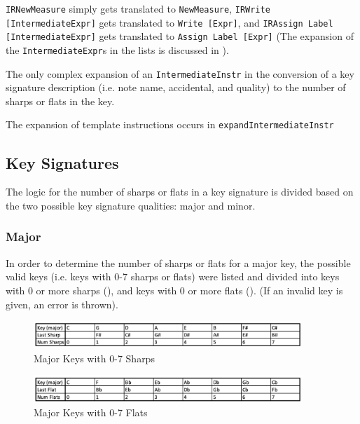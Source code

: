 \documentclass{report}
\begin{document}
\verb.IRNewMeasure. simply gets translated to \verb.NewMeasure., \verb.IRWrite [IntermediateExpr]. gets translated to \verb.Write [Expr]., and \verb.IRAssign Label [IntermediateExpr]. gets translated to \verb.Assign Label [Expr]. (The expansion of the \verb.IntermediateExpr.s in the lists is discussed in ). 

The only complex expansion of an \verb.IntermediateInstr. in the conversion of a key signature description (i.e. note name, accidental, and quality) to the number of sharps or flats in the key.

The expansion of template instructions occurs in \verb.expandIntermediateInstr.
\subsection{Key Signatures}
The logic for the number of sharps or flats in a key signature is divided based on the two possible key signature qualities: major and minor. 
\subsubsection{Major}

In order to determine the number of sharps or flats for a major key, the possible valid keys (i.e. keys with 0-7 sharps or flats) were listed and divided into keys with 0 or more sharps (), and keys with 0 or more flats (). (If an invalid key is given, an error is thrown).

\begin{figure}[h!]
\centering
\includegraphics[width=0.9\textwidth]{images/major_sharp}
\caption{Major Keys with 0-7 Sharps}
\label{major_sharp}
\end{figure}

\begin{figure}[h!]
\centering
\includegraphics[width=0.9\textwidth]{images/major_flat}
\caption{Major Keys with 0-7 Flats}
\label{major_flat}
\end{figure}
\end{document}
